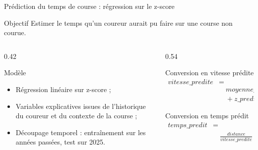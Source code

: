 \documentclass[aspectratio=169,11pt]{beamer}
\begin{document}
\begin{frame}{Prédiction du temps de course : régression sur le z-score}
  \begin{block}{Objectif}
    Estimer le temps qu'un coureur aurait pu faire sur une course non courue.
  \end{block}

  \vspace{0.2cm}
  \begin{columns}[T,onlytextwidth]
    \begin{column}{0.42\textwidth}
      \begin{block}{Modèle}
      \begin{itemize}
        \item Régression linéaire sur z-score ;
        \item Variables explicatives issues de l'historique du coureur et du contexte de la course ;
        \item Découpage temporel : entraînement sur les années passées, test sur 2025.
      \end{itemize}
      \end{block}
    \end{column}

    \begin{column}{0.54\textwidth}
      \begin{block}{Conversion en vitesse prédite}
        \small
        \[
        \begin{aligned}
        vitesse\_predite &= \\
        &\quad moyenne\_course \\
        &\quad + z\_predit \times ecart\_type\_course
        \end{aligned}
        \]
      \end{block}

      \vspace{0.15cm}
      \begin{block}{Conversion en temps prédit}
        \small
        \[
        \begin{aligned}
        temps\_predit &= \\
        &\quad \frac{distance}{vitesse\_predite} \times 3600
        \end{aligned}
        \]
      \end{block}
    \end{column}
  \end{columns}
\end{frame}
\end{document}
